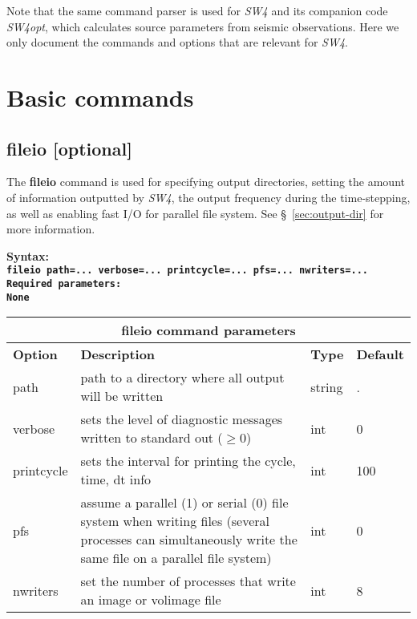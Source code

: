 \documentclass[11pt]{report}
\begin{document}
Note that the same command parser is used for \emph{SW4} and its companion code \emph{SW4opt}, which
calculates source parameters from seismic observations. Here we only document the commands and options
that are relevant for \emph{SW4}.

\section{Basic commands}

\subsection{fileio [optional]}
The {\bf fileio} command is used for specifying output directories, setting the amount of
information outputted by \emph{SW4}, the output frequency during the time-stepping, as well
as enabling fast I/O for parallel file system. See \S~\ref{sec:output-dir} for more information.
\begin{flushleft}\bf
Syntax:\\ \tt fileio path=... verbose=... printcycle=... pfs=... nwriters=... \\ 
\bf Required parameters:\\ 
\rm None
\end{flushleft}
\begin{center}
\begin{tabular}{|l|p{8cm}|l|l|} \hline
\multicolumn{4}{|c|}{\bf fileio command parameters}\\ \hline
\bf{Option} & \bf{Description} & \bf{Type} & \bf{Default} \\ \hline \hline
path        & path to a directory where all output will be written & string & . \\ \hline
verbose	    & sets the level of diagnostic messages written to standard out ($\geq 0$) & int & 0  \\ \hline
printcycle  & sets the interval for printing the cycle, time, dt info & int & 100 \\ \hline
pfs         & assume a parallel (1) or serial (0) file system when writing files (several
processes can simultaneously write the same file on a parallel file system) & int & 0 \\ \hline
nwriters    & set the number of processes that write an image or volimage file & int & 8 \\ \hline
\end{tabular}
\end{center}
\end{document}
